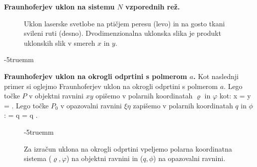 \begin{example}{\bf Fraunhoferjev uklon na sistemu $N$ vzporednih rež.}
\begin{figure}[ht]
\caption{Uklon laserske svetlobe na ptičjem peresu (levo) in na gosto tkani svileni ruti (desno).
Dvodimenzionalna uklonska slika je produkt uklonskih slik v smereh $x$ in $y$.}
\label{fig:05_uklon_ruta}
\end{figure}
\vglue-5truemm
\end{example}

\begin{example}{\bf Fraunhoferjev uklon na okrogli odprtini s polmerom $a$.}
Kot naslednji primer si oglejmo Fraunhoferjev uklon na okrogli odprtini s polmerom $a$. 
Lego točke $P$ v objektni ravnini $xy$ opišemo v polarnih koordinatah $\varrho$ in $\varphi$
kot:
\beq
x = \varrho \cos \varphi \qquad {} \qquad y = \varrho \sin \varphi. 
\label{eq:05_30}
\eeq
Lego točke $P_0$ v opazovalni ravnini $\xi \eta$ zapišemo v polarnih koordinatah 
$q$ in $\phi$:
\beq
\xi = q \cos \phi \qquad {} \qquad \eta = q \sin \phi. 
\label{eq:05_31}
\eeq
\begin{figure}[ht]
\vglue-5truemm
\centering
\def\svgwidth{130truemm} 

\caption{Za izračun uklona na okrogli odprtini vpeljemo polarna koordinatna sistema 
($\varrho, \varphi$) na objektni ravnini in ($q, \phi$) na opazovalni ravnini.}
\label{fig:05_koordinate_circ}
\end{figure}


\end{example}
